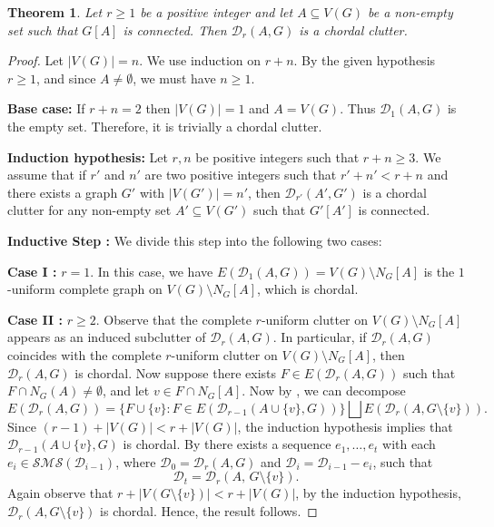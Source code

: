 \documentclass[12pt,reqno]{amsart}
\newtheorem{theorem}[proposition]{Theorem}
\theoremstyle{definition}
\def\D{\mathcal{D}}
\def\SMS{\mathcal{SMS}}
\begin{document}
\begin{theorem}\label{chordal 2}
    Let $r \ge 1$ be a positive integer and let $A \subseteq V(G)$ be a non-empty set such that $G[A]$ is connected. Then $\D_r(A,G)$ is a chordal clutter. 
\end{theorem}
\begin{proof}
Let $|V(G)|=n$. We use induction on $r+n$. By the given hypothesis $r\ge 1$, and since $A\neq\emptyset$, we must have $n\ge 1$.
		
		\medskip
		\noindent
		\textbf{Base case: }If $r+n=2$ then $|V(G)|=1$ and $A = V(G)$. Thus $\D_1(A,G)$ is the empty set. Therefore, it is trivially a chordal clutter.
		
		\medskip
		\noindent
		\textbf{Induction hypothesis: } Let $r,n$ be positive integers such that $r+n\ge 3$. We assume that if $r'$ and $n'$ are two positive integers such that $r'+n'<r+n$ and there exists a graph $G'$ with $|V(G')|=n'$, then $\D_{r'}(A',G')$ is a chordal clutter for any non-empty set $A'\subseteq V(G')$ such that $G'[A']$ is connected.
		
		\medskip
		\noindent
		\textbf{Inductive Step :} We divide this step into the following two cases:
		
		\medskip
		\noindent
		\textbf{Case I :} $r=1$. In this case, we have $E(\D_1(A,G)) = V(G) \setminus N_G[A]$ is the $1$-uniform complete graph on $V(G) \setminus N_G[A]$, which is chordal. 
		
		\medskip
		\noindent
		\textbf{Case II :} $r\ge 2$. Observe that the complete $r$-uniform clutter on $V(G) \setminus N_G[A]$ appears as an induced subclutter of $\D_r(A,G)$. In particular, if $\D_r(A,G)$ coincides with the complete $r$-uniform clutter on $V(G) \setminus N_G[A]$, then $\D_r(A,G)$ is  chordal. 
Now suppose there exists $F \in E(\D_r(A,G))$ such that $F \cap N_G(A) \neq \emptyset$, and let $v \in F \cap N_G[A]$. Now by , we can decompose
\[
E(\D_r(A,G)) = \{ F \cup \{v\} : F \in E(\D_{r-1}(A \cup \{v\}, G))\} \bigsqcup E(\D_r(A, G \setminus \{v\})).
\]
Since $(r-1) + |V(G)| < r + |V(G)|$, the induction hypothesis implies that $\D_{r-1}(A \cup \{v\},G)$ is chordal. 
By  there exists a sequence $e_1, \ldots, e_t$
with each $e_i \in \SMS(\D_{i-1})$, where $\D_0 = \D_r(A,G)$ and $\D_i = \D_{i-1} - e_i$, such that 
\[
\D_t = \D_r(A,\, G \setminus \{v\}).
\] Again observe that $r + |V(G \setminus \{v\})| < r + |V(G)|$, by the induction hypothesis, $\D_r(A, G\setminus \{v\})$ is chordal. Hence, the result follows.  
\end{proof}
\end{document}
